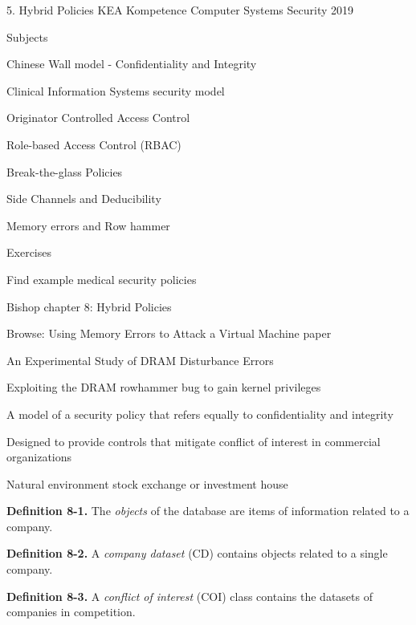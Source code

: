 \documentclass[Screen16to9,17pt]{foils}
\begin{document}
\mytitlepage
{5. Hybrid Policies}
{KEA Kompetence Computer Systems Security 2019}



\begin{list1}
\item Subjects
\begin{list2}
\item Chinese Wall model - Confidentiality and Integrity
\item Clinical Information Systems security model
\item Originator Controlled Access Control
\item Role-based Access Control (RBAC)
\item Break-the-glass Policies
\item Side Channels and Deducibility
\item Memory errors and Row hammer
\end{list2}
\item Exercises
\begin{list2}
\item Find example medical security policies
\item
\end{list2}
\end{list1}




\begin{list1}
\item Bishop chapter 8: Hybrid Policies
\item Browse: Using Memory Errors to Attack a Virtual Machine paper
\item An Experimental Study of DRAM Disturbance Errors
\item Exploiting the DRAM rowhammer bug to gain kernel privileges
\item {}
\end{list1}




\begin{list1}
\item A model of a security policy that refers equally to confidentiality and integrity
\item Designed to provide controls that mitigate conflict of interest in commercial organizations
\item Natural environment stock exchange or investment house
\item {\bf Definition 8-1.} The \emph{objects} of the database are items of information related to a company.
\item {\bf Definition 8-2.} A \emph{company dataset} (CD) contains objects related to a single company.
\item {\bf Definition 8-3.} A \emph{conflict of interest} (COI) class contains the datasets of companies in competition.
\item
\item
\end{list1}
\end{document}
